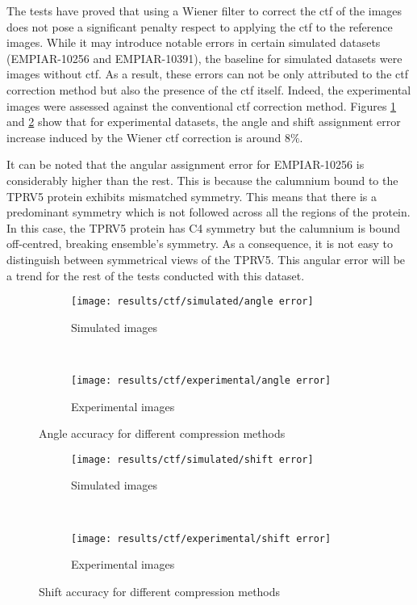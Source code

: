 \documentclass[../main.tex]{subfiles}
\begin{document}
The tests have proved that using a Wiener filter to correct the \gls{ctf} of the images does not pose a significant penalty respect to applying the \gls{ctf} to the reference images. While it may introduce notable errors in certain simulated datasets (EMPIAR-10256 and EMPIAR-10391), the baseline for simulated datasets were images without \gls{ctf}. As a result, these errors can not be only attributed to the \gls{ctf} correction method but also the presence of the \gls{ctf} itself. Indeed, the experimental images were assessed against the conventional \gls{ctf} correction method. Figures \ref{fig:5:ctf_angle_accuracy} and \ref{fig:5:ctf_shift_accuracy} show that for experimental datasets, the angle and shift assignment error increase induced by the Wiener \gls{ctf} correction is around $8 \si{\percent}$.

It can be noted that the angular assignment error for EMPIAR-10256 is considerably higher than the rest. This is because the calumnium bound to the TPRV5 protein exhibits mismatched symmetry. This means that there is a predominant symmetry which is not followed across all the regions of the protein. In this case, the TPRV5 protein has C4 symmetry but the calumnium is bound off-centred, breaking ensemble's symmetry. As a consequence, it is not easy to distinguish between symmetrical views of the TPRV5. This angular error will be a trend for the rest of the tests conducted with this dataset.

\begin{figure}[htbp]
    \centering
    \begin{subfigure}[b]{.8\textwidth}
         \centering
         \texttt{[image: results/ctf/simulated/angle error]}
         \caption{Simulated images}
    \end{subfigure}\\
    \vspace{2em}
    \begin{subfigure}[b]{.8\textwidth}
         \centering
         \texttt{[image: results/ctf/experimental/angle error]}
         \caption{Experimental images}
    \end{subfigure}
    \caption{Angle accuracy for different compression methods}
    \label{fig:5:ctf_angle_accuracy}
\end{figure}

\begin{figure}[htbp]
    \centering
    \begin{subfigure}[b]{.8\textwidth}
         \centering
         \texttt{[image: results/ctf/simulated/shift error]}
         \caption{Simulated images}
    \end{subfigure}\\
    \vspace{2em}
    \begin{subfigure}[b]{.8\textwidth}
         \centering
         \texttt{[image: results/ctf/experimental/shift error]}
         \caption{Experimental images}
    \end{subfigure}
    \caption{Shift accuracy for different compression methods}
    \label{fig:5:ctf_shift_accuracy}
\end{figure}
\end{document}
